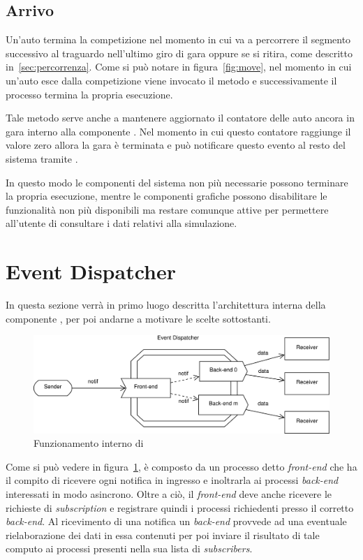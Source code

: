 \subsection{Arrivo}
Un'auto termina la competizione nel momento in cui va a percorrere il segmento successivo al traguardo nell'ultimo giro di gara oppure se si ritira, come descritto in~\ref{sec:percorrenza}. Come si può notare in figura~\ref{fig:move}, nel momento in cui un'auto esce dalla competizione viene invocato il metodo  e successivamente il processo termina la propria esecuzione.

Tale metodo serve anche a mantenere aggiornato il contatore delle auto ancora in gara interno alla componente \track{}. Nel momento in cui questo contatore raggiunge il valore zero allora la gara è terminata e \track{} può notificare questo evento al resto del sistema tramite \evdisp{}.

In questo modo le componenti del sistema non più necessarie possono terminare la propria esecuzione, mentre le componenti grafiche possono disabilitare le funzionalità non più disponibili ma restare comunque attive per permettere all'utente di consultare i dati relativi alla simulazione.

\section{Event Dispatcher}
\label{sec:dispatcherImpl}
In questa sezione verrà in primo luogo descritta l'architettura interna della componente \evdisp{}, per poi andarne a motivare le scelte sottostanti.

\begin{figure}
\includegraphics[width=\textwidth]{diagrammi/Dispatcher}
\caption{Funzionamento interno di \evdisp{}}
\label{fig:dispatcher}
\end{figure}

Come si può vedere in figura~\ref{fig:dispatcher}, \evdisp{} è composto da un processo detto \textit{front-end} che ha il compito di ricevere ogni notifica in ingresso e inoltrarla ai processi \textit{back-end} interessati in modo asincrono. Oltre a ciò, il \textit{front-end} deve anche ricevere le richieste di \textit{subscription} e registrare quindi i processi richiedenti presso il corretto \textit{back-end}. Al ricevimento di una notifica un \textit{back-end} provvede ad una eventuale rielaborazione dei dati in essa contenuti per poi inviare il risultato di tale computo ai processi presenti nella sua lista di \textit{subscribers}.

